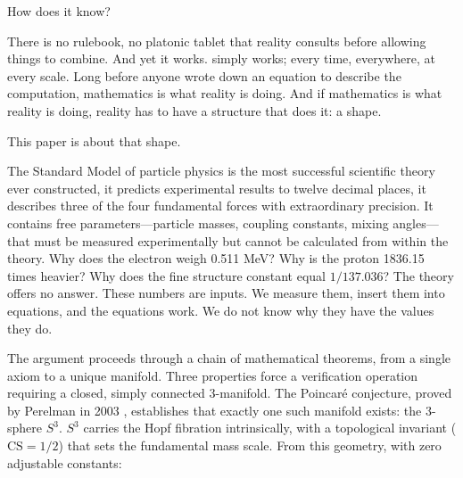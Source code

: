 \documentclass[12pt]{article}
\begin{document}
How does it know?

There is no rulebook, no platonic tablet that reality consults before allowing things to combine. And yet it works. simply works; every time, everywhere, at every scale. Long before anyone wrote down an equation to describe the computation, mathematics is what reality is doing. And if mathematics is what reality is doing, reality has to have a structure that does it: a shape. 

This paper is about that shape.

The Standard Model of particle physics is the most successful scientific theory ever constructed, it predicts experimental results to twelve decimal places, it describes three of the four fundamental forces with extraordinary precision. It contains free parameters---particle masses, coupling constants, mixing angles---that must be measured experimentally but cannot be calculated from within the theory. Why does the electron weigh 0.511 MeV? Why is the proton 1836.15 times heavier? Why does the fine structure constant equal $1/137.036$? The theory offers no answer. These numbers are inputs. We measure them, insert them into equations, and the equations work. We do not know why they have the values they do.

The argument proceeds through a chain of mathematical theorems, from a single axiom to a unique manifold. Three properties force a verification operation requiring a closed, simply connected 3-manifold. The Poincar\'e conjecture, proved by Perelman in 2003 \cite{perelman2003}, establishes that exactly one such manifold exists: the 3-sphere $S^3$. $S^3$ carries the Hopf fibration intrinsically, with a topological invariant ($\mathrm{CS} = 1/2$) that sets the fundamental mass scale. From this geometry, with zero adjustable constants:
\end{document}

